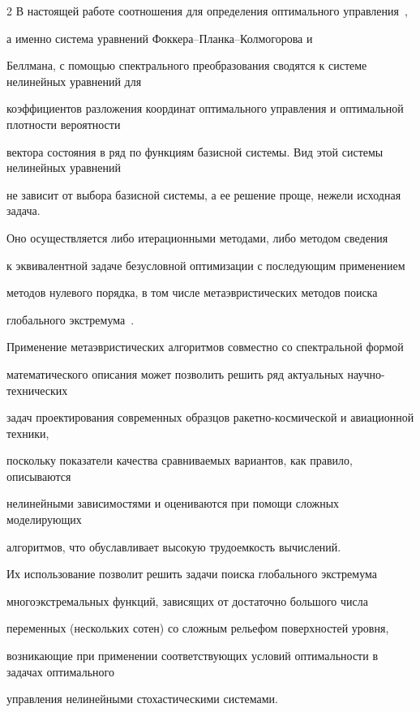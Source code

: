 \begin{multicols}{2}
В настоящей работе соотношения для определения оптимального управления~\cite{PanBor, Pan_Synt}, 


а именно сис\-те\-ма уравнений Фок\-ке\-ра--План\-ка--Кол\-мо\-го\-ро\-ва и 


Беллмана, с помощью спектрального преобразования сводятся к системе нелинейных уравнений для 


коэффициентов разложения координат оптимального управления и оптимальной плотности вероятности 


вектора состояния в ряд по функциям базисной системы. Вид этой сис\-те\-мы нелинейных уравнений 


не зависит от выбора базисной системы, а ее решение проще, нежели исходная задача. 


Оно осуществляется либо итерационными методами, либо методом сведения 


к эквивалентной задаче безусловной оптимизации с последующим применением 


методов нулевого порядка, в том числе метаэвристических методов поиска 


глобального экстремума~\cite{PanLet, Pan_GlobOpt}.





Применение метаэвристических алгоритмов совместно со спектральной формой 


математического описания может позволить решить ряд актуальных на\-уч\-но-тех\-ни\-че\-ских 


задач проектирования современных образцов ра\-кет\-но-кос\-ми\-че\-ской и авиационной техники, 


поскольку показатели качества сравниваемых вариантов, как правило, описываются 


нелинейными зависимостями и оцениваются при помощи сложных моделирующих 


алгоритмов, что обуславливает высокую трудоемкость вычислений. 


Их использование позволит решить задачи поиска глобального экстремума 


многоэкстремальных функций, зависящих от достаточно большого числа 


переменных (нескольких сотен) со сложным рельефом поверхностей уровня, 


возникающие при применении соответствующих условий оптимальности в задачах оптимального 


управления нелинейными стохастическими сис\-те\-мами.






\end{multicols}
